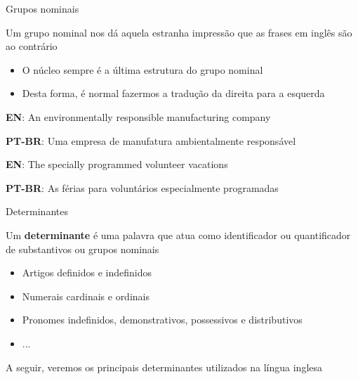 \documentclass[compress,mathserif,xcolor=table]{beamer}
\begin{document}

\begin{frame}{Grupos nominais}

Um grupo nominal nos dá aquela estranha impressão que as frases em inglês são ao contrário
\begin{itemize}
    \item O núcleo sempre é a última estrutura do grupo nominal
    \item Desta forma, é normal fazermos a tradução da direita para a esquerda
\end{itemize}

\vspace{1cm}

\textbf{EN}: An environmentally responsible manufacturing company

\textbf{PT-BR}: Uma empresa de manufatura ambientalmente responsável

\vspace{0.5cm}

\textbf{EN}: The specially programmed volunteer vacations

\textbf{PT-BR}: As férias para voluntários especialmente programadas
\end{frame}


\begin{frame}{Determinantes}

Um \textbf{determinante} é uma palavra que atua como identificador ou quantificador de substantivos ou grupos nominais
\begin{itemize}
    \item Artigos definidos e indefinidos
    \item Numerais cardinais e ordinais
    \item Pronomes indefinidos, demonstrativos, possessivos e distributivos
    \item ...
\end{itemize}

\vspace{0.5cm}

A seguir, veremos os principais determinantes utilizados na língua inglesa

\end{frame}

\end{document}
